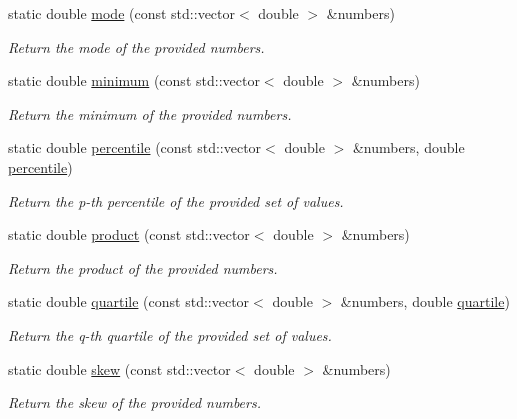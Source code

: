 \begin{DoxyCompactItemize}
static double \hyperlink{classmultiscale_1_1Numeric_a09dc6e20116ac163389d3b07a99618e1}{mode} (const std\-::vector$<$ double $>$ \&numbers)
\begin{DoxyCompactList}\small\item\em \-Return the mode of the provided numbers. \end{DoxyCompactList}\item 
static double \hyperlink{classmultiscale_1_1Numeric_a1ba7305dcaa1d1baf17946beb233145d}{minimum} (const std\-::vector$<$ double $>$ \&numbers)
\begin{DoxyCompactList}\small\item\em \-Return the minimum of the provided numbers. \end{DoxyCompactList}\item 
static double \hyperlink{classmultiscale_1_1Numeric_aff0c6b0c3d82bec3761a5e2d08394513}{percentile} (const std\-::vector$<$ double $>$ \&numbers, double \hyperlink{classmultiscale_1_1Numeric_aff0c6b0c3d82bec3761a5e2d08394513}{percentile})
\begin{DoxyCompactList}\small\item\em \-Return the p-\/th percentile of the provided set of values. \end{DoxyCompactList}\item 
static double \hyperlink{classmultiscale_1_1Numeric_af07966e00665420d17a8f4d2cd1d74b4}{product} (const std\-::vector$<$ double $>$ \&numbers)
\begin{DoxyCompactList}\small\item\em \-Return the product of the provided numbers. \end{DoxyCompactList}\item 
static double \hyperlink{classmultiscale_1_1Numeric_a127a2b3e5e659b4e493767ba23fc45da}{quartile} (const std\-::vector$<$ double $>$ \&numbers, double \hyperlink{classmultiscale_1_1Numeric_a127a2b3e5e659b4e493767ba23fc45da}{quartile})
\begin{DoxyCompactList}\small\item\em \-Return the q-\/th quartile of the provided set of values. \end{DoxyCompactList}\item 
static double \hyperlink{classmultiscale_1_1Numeric_a3e6b145db3ae9d7d21c3992353211125}{skew} (const std\-::vector$<$ double $>$ \&numbers)
\begin{DoxyCompactList}\small\item\em \-Return the skew of the provided numbers. \end{DoxyCompactList}\item 

\end{DoxyCompactItemize}
